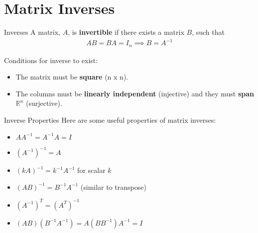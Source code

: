\section{Matrix Inverses}

\begin{frame}{Inverses}
    A matrix, $A$, is \textbf{invertible} if there exists a matrix $B$, such that
    \begin{align*}
        AB = BA = I_n \implies B = A^{-1}
    \end{align*}
    
    Conditions for inverse to exist:
    \begin{itemize}
        \item The matrix must be \textbf{square} (n x n).
        \item The columns must be \textbf{linearly independent} (injective) and they must \textbf{span} $\mathbb{R}^n$ (surjective).
    \end{itemize}
\end{frame}

\begin{frame}{Inverse Properties}
    Here are some useful properties of matrix inverses:
    \begin{itemize}
        \item $AA^{-1} = A^{-1}A = I$
        \item $(A^{-1})^{-1} = A$
        \item $(kA)^{-1} = k^{-1}A^{-1}$ for scalar $k$
        \item $(AB)^{-1} = B^{-1}A^{-1}$ (similar to transpose)
        \item $(A^{-1})^T = (A^T)^{-1}$
        \item $(AB) (B^{-1}A^{-1}) = A (BB^{-1}) A^{-1} = I$
    \end{itemize}
\end{frame}


